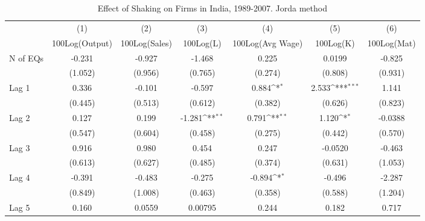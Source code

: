 \begin{table}[htbp]\centering
\def\sym#1{\ifmmode^{#1}\else\(^{#1}\)\fi}
\caption{Effect of Shaking on Firms in India, 1989-2007. Jorda method}
\begin{tabular}{l*{6}{c}}
\toprule
                &\multicolumn{1}{c}{(1)}&\multicolumn{1}{c}{(2)}&\multicolumn{1}{c}{(3)}&\multicolumn{1}{c}{(4)}&\multicolumn{1}{c}{(5)}&\multicolumn{1}{c}{(6)}\\
                &\multicolumn{1}{c}{100Log(Output)}&\multicolumn{1}{c}{100Log(Sales)}&\multicolumn{1}{c}{100Log(L)}&\multicolumn{1}{c}{100Log(Avg Wage)}&\multicolumn{1}{c}{100Log(K)}&\multicolumn{1}{c}{100Log(Mat)}\\
\midrule
N of EQs        &   -0.231         &   -0.927         &   -1.468         &    0.225         &   0.0199         &   -0.825         \\
                &  (1.052)         &  (0.956)         &  (0.765)         &  (0.274)         &  (0.808)         &  (0.931)         \\
\addlinespace
Lag 1           &    0.336         &   -0.101         &   -0.597         &    0.884\sym{*}  &    2.533\sym{***}&    1.141         \\
                &  (0.445)         &  (0.513)         &  (0.612)         &  (0.382)         &  (0.626)         &  (0.823)         \\
\addlinespace
Lag 2           &    0.127         &    0.199         &   -1.281\sym{**} &    0.791\sym{**} &    1.120\sym{*}  &  -0.0388         \\
                &  (0.547)         &  (0.604)         &  (0.458)         &  (0.275)         &  (0.442)         &  (0.570)         \\
\addlinespace
Lag 3           &    0.916         &    0.980         &    0.454         &    0.247         &  -0.0520         &   -0.463         \\
                &  (0.613)         &  (0.627)         &  (0.485)         &  (0.374)         &  (0.631)         &  (1.053)         \\
\addlinespace
Lag 4           &   -0.391         &   -0.483         &   -0.275         &   -0.894\sym{*}  &   -0.496         &   -2.287         \\
                &  (0.849)         &  (1.008)         &  (0.463)         &  (0.358)         &  (0.588)         &  (1.204)         \\
\addlinespace
Lag 5           &    0.160         &   0.0559         &  0.00795         &    0.244         &    0.182         &    0.717         \\

\end{tabular}
\end{table}
